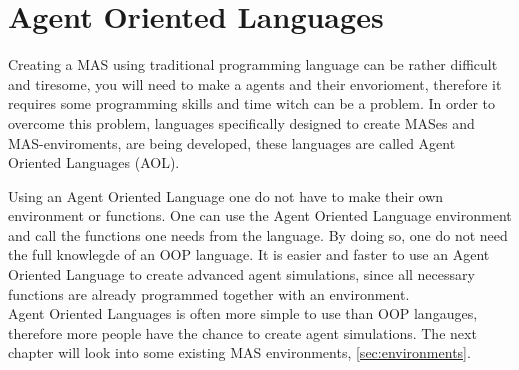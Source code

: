 \section{Agent Oriented Languages}
\indent Creating a MAS using traditional programming language can be rather difficult and tiresome, you will need to make a agents and their envorioment, therefore it requires some programming skills and time witch can be a problem. In order to overcome this problem, languages specifically designed to create MASes and MAS-enviroments, are being developed, these languages are called Agent Oriented Languages (AOL). 

\indent Using an Agent Oriented Language one do not have to make their own environment or functions. One can use the Agent Oriented Language environment and call the functions one needs from the language. By doing so, one do not need the full knowlegde of an OOP language. It is easier and faster to use an Agent Oriented Language to create advanced agent simulations, since all necessary functions are already programmed together with an environment.\\
Agent Oriented Languages is often more simple to use than OOP langauges, therefore more people have the chance to create agent simulations. The next chapter will look into some existing MAS environments, \ref{sec:environments}.
  